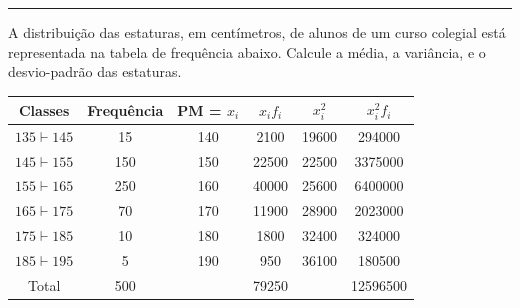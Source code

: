 \documentclass[a4paper,11pt,fleqn]{article}\usepackage[]{graphicx}\usepackage[]{color}
\theoremstyle{definition}
\begin{document}
\vspace{0.3cm}
\hrule
\vspace{0.3cm}

\begin{compactenum}[6.] %
\item A distribuição das estaturas, em centímetros, de alunos de um
  curso colegial está representada na tabela de frequência abaixo.
  Calcule a média, a variância, e o desvio-padrão das estaturas.
  \begin{table}[htbp]
    \begin{center}
      \begin{tabular}{cccccc}
        \hline
        Classes          & Frequência & PM = $x_i$ & $x_if_i$ & $x_i^2$ & $x_i^2f_i$ \\
        \hline
        $135 \vdash 145$ & 15         & 140        & 2100     & 19600   & 294000     \\
        $145 \vdash 155$ & 150        & 150        & 22500    & 22500   & 3375000    \\
        $155 \vdash 165$ & 250        & 160        & 40000    & 25600   & 6400000    \\
        $165 \vdash 175$ & 70         & 170        & 11900    & 28900   & 2023000    \\
        $175 \vdash 185$ & 10         & 180        & 1800     & 32400   & 324000     \\
        $185 \vdash 195$ & 5          & 190        & 950      & 36100   & 180500     \\
        \hline
        Total            & 500        &            & 79250    &         & 12596500   \\
        \hline
      \end{tabular}
    \end{center}
  \end{table}




\end{compactenum}
\end{document}
